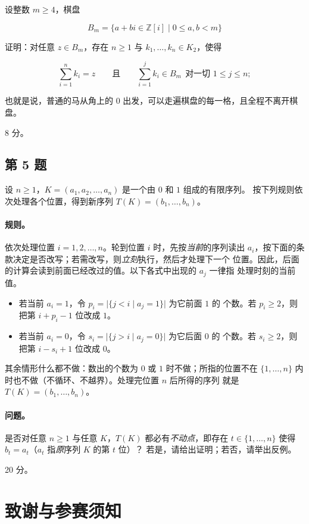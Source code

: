 \documentclass[UTF8]{ctexart}
\begin{document}
设整数 $m\ge 4$，棋盘

$$B_m=\{a+bi\in\mathbb{Z}[i]\mid 0\le a,b<m\}$$

证明：对任意 $z\in B_m$，存在 $n\ge 1$ 与 $k_1,\ldots,k_n\in K_2$，使得

$$\sum_{i=1}^n k_i=z\qquad\text{且}\qquad
\sum_{i=1}^j k_i\in B_m\ \ \text{对一切 } 1\le j\le n ;$$

也就是说，普通的马从角上的 $0$ 出发，可以走遍棋盘的每一格，且全程不离开棋盘。

8 分。

\subsection{第 5 题}

设 $n\ge 1$，$K=(a_1,a_2,\ldots ,a_n)$ 是一个由 $0$ 和 $1$ 组成的有限序列。
按下列规则依次处理各个位置，得到新序列 $T(K)=(b_1,\ldots ,b_n)$。

\paragraph{规则。}
依次处理位置 $i=1,2,\ldots ,n$。轮到位置 $i$ 时，先按\emph{当前}的序列读出
$a_i$，按下面的条款决定是否改写；若需改写，则\emph{立刻}执行，然后才处理下一个
位置。因此，后面的计算会读到前面已经改过的值。以下各式中出现的 $a_j$ 一律指
处理时刻的当前值。
\begin{itemize}
\item 若当前 $a_i=1$，令 $p_i=\bigl|\{j<i\mid a_j=1\}\bigr|$ 为它前面 $1$ 的
个数。若 $p_i\ge 2$，则把第 $i+p_i-1$ 位改成 $1$。
\item 若当前 $a_i=0$，令 $s_i=\bigl|\{j>i\mid a_j=0\}\bigr|$ 为它后面 $0$ 的
个数。若 $s_i\ge 2$，则把第 $i-s_i+1$ 位改成 $0$。
\end{itemize}
其余情形什么都不做：数出的个数为 $0$ 或 $1$ 时不做；所指的位置不在
$\{1,\ldots ,n\}$ 内时也不做（不循环、不越界）。处理完位置 $n$ 后所得的序列
就是 $T(K)=(b_1,\ldots ,b_n)$。

\paragraph{问题。}
是否对任意 $n\ge 1$ 与任意 $K$，$T(K)$ 都必有\emph{不动点}，即存在
$t\in\{1,\ldots ,n\}$ 使得 $b_t=a_t$（$a_t$ 指\emph{原}序列 $K$ 的第 $t$ 位）？
若是，请给出证明；若否，请举出反例。

20 分。

\section{致谢与参赛须知}
\end{document}

